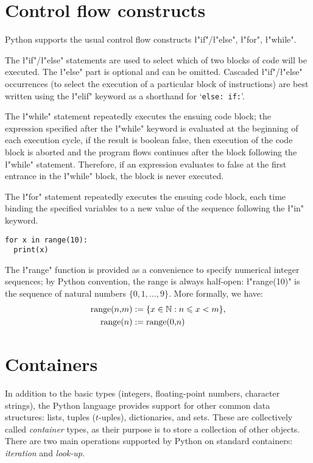 \section{Control flow constructs}
\label{sec:control-flow}

Python supports the usual control flow constructs
\l"if"/\l"else", \l"for", \l"while".

The \l"if"/\l"else" statements are used to select which of two
blocks of code will be executed.  The \l"else" part is optional and
can be omitted.  Cascaded \l"if"/\l"else" occurrences (to
select the execution of a particular block of instructions) are best
written using the \l"elif" keyword as a shorthand for 
`\verb"else: if:"'. 

The \l"while" statement repeatedly executes the ensuing code block;
the expression specified after the \l"while" keyword is evaluated
at the beginning of each execution cycle, if the result is boolean
false, then execution of the code block is aborted and the program
flows continues after the block following the \l"while" statement.
Therefore, if an expression evaluates to false at the first entrance
in the \l"while" block, the block is never executed.

The \l"for" statement repeatedly executes the ensuing code block,
each time binding the specified variables to a new value of the
sequence following the \l"in" keyword.
\begin{lstlisting}
for x in range(10):
  print(x)
\end{lstlisting}
The \l"range" function is provided as a convenience to specify
numerical integer sequences; by Python convention, the range is always
half-open: \l"range(10)" is the sequence of natural numbers $\{0,
1, \ldots, 9\}$.  More formally, we have:
\begin{align*}
  \text{\l"range"($n$,$m$)} &:= \{ x \in \setN : n \leq x < m \},
  \\
  \text{\l"range"($n$)} &:= \text{\l"range"(0,$n$)}
\end{align*}



\section{Containers}
\label{sec:containers}

In addition to the basic types (integers, floating-point numbers,
character strings), the Python language provides support for other
common data structures: lists, tuples ($t$-uples), dictionaries, and
sets.  These are collectively called \emph{container} types, as their
purpose is to store a collection of other objects.
There are two main operations supported by Python on standard
containers: \emph{iteration} and \emph{look-up}.

